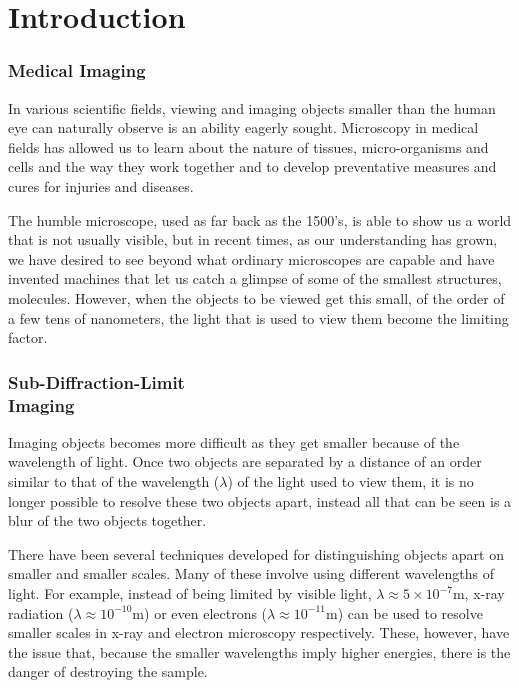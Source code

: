 \part{Introduction}

\section{Medical Imaging}
\label{sec:section_name}

In various scientific fields, viewing and imaging objects smaller than the human
eye can naturally observe is an ability eagerly sought. Microscopy in medical
fields has allowed us to learn about the nature of tissues, micro-organisms and
cells and the way they work together and to develop preventative measures and
cures for injuries and diseases.

The humble microscope, used as far back as the 1500's, is able to show us a
world that is not usually visible, but in recent times, as our understanding
has grown, we have desired to see beyond what ordinary microscopes are capable
and have invented machines that let us catch a glimpse of some of the smallest
structures, molecules. However, when the objects to be viewed get this small, of
the order of a few tens of nanometers, the light that is used to view them
become the limiting factor.

\section[Sub-Diffraction-Limit Imaging]{Sub-Diffraction-Limit\\ Imaging}
\label{sec:sub_diffraction_limit_imaging}

Imaging objects becomes more difficult as they get smaller because of the
wavelength of light. Once two objects are separated by a distance of an order
similar to that of the wavelength ($\lambda$) of the light used to view them,
it is no longer possible to resolve these two objects apart, instead all that
can be seen is a blur of the two objects together.

There have been several techniques developed for distinguishing objects apart
on smaller and smaller scales. Many of these involve using different
wavelengths of light.  For example, instead of being limited by visible light,
$\lambda \approx 5\times 10^{-7} \textrm{m}$, x-ray radiation ($\lambda \approx
10^{-10} \textrm{m}$) or even electrons ($\lambda \approx 10^{-11} \textrm{m}$)
can be used to resolve smaller scales in x-ray and electron microscopy
respectively. These, however, have the issue that, because the smaller
wavelengths imply higher energies, there is the danger of destroying the sample.

